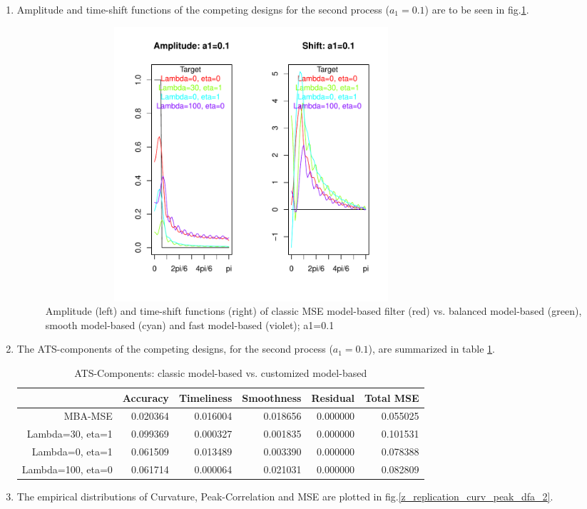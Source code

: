 \documentclass[a4paper]{book}
\begin{document}
\begin{enumerate}
\item Amplitude and time-shift functions of the competing designs for the second process ($a_1=0.1$) are to be seen in fig.\ref{z_replication_amp_shift_dfa_2}. 
\begin{figure}[H]\begin{center}\includegraphics[height=4in, width=6in]{z_replication_amp_shift_dfa_2}\caption{Amplitude (left) and time-shift functions (right) of classic MSE model-based filter (red) vs. balanced model-based (green), smooth model-based (cyan) and fast model-based (violet);  a1=0.1\label{z_replication_amp_shift_dfa_2}}\end{center}\end{figure}\item The ATS-components of the competing designs, for the second process ($a_1=0.1$), are summarized in table \ref{z_replication_ats_dfa_2}.
\begin{table}[ht]
\centering
\begin{tabular}{rrrrrr}
  \hline
 & Accuracy & Timeliness & Smoothness & Residual & Total MSE \\ 
  \hline
MBA-MSE & 0.020364 & 0.016004 & 0.018656 & 0.000000 & 0.055025 \\ 
  Lambda=30, eta=1 & 0.099369 & 0.000327 & 0.001835 & 0.000000 & 0.101531 \\ 
  Lambda=0, eta=1 & 0.061509 & 0.013489 & 0.003390 & 0.000000 & 0.078388 \\ 
  Lambda=100, eta=0 & 0.061714 & 0.000064 & 0.021031 & 0.000000 & 0.082809 \\ 
   \hline
\end{tabular}
\caption{ATS-Components: classic model-based vs. customized model-based } 
\label{z_replication_ats_dfa_2}
\end{table}
\item The empirical distributions of Curvature, Peak-Correlation and MSE are plotted in fig.\ref{z_replication_curv_peak_dfa_2}.


\end{enumerate}
\end{document}
